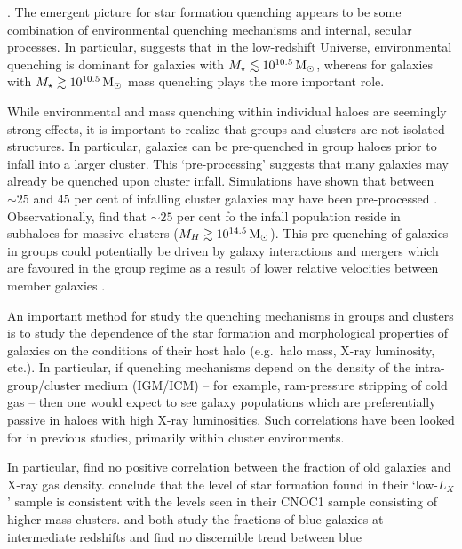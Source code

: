 \citep{balogh2004, muzzin2012}.  The emergent picture for star
formation quenching appears to be some combination of environmental
quenching mechanisms and internal, secular processes.  In particular,
\citep{peng2010} suggests that in the low-redshift Universe,
environmental quenching is dominant for galaxies with $M_\star \lesssim
10^{10.5}\,\mathrm{M_{\odot}}$, whereas for galaxies with $M_\star \gtrsim
10^{10.5}\,\mathrm{M_{\odot}}$ mass quenching plays the more important role.
\par
While environmental and mass quenching within individual haloes are
seemingly strong effects, it is important to realize that groups and
clusters are not isolated structures.  In particular, galaxies can be
pre-quenched in group haloes prior to infall into a larger cluster.
This `pre-processing' suggests that many galaxies may already be
quenched upon cluster infall.  Simulations have shown that between
$\sim 25$ and $45$ per cent of infalling cluster galaxies may have
been pre-processed \citep{mcgee2009, delucia2012}.  Observationally,
\citep{hou2014} find that $\sim 25$ per cent fo the infall population
reside in subhaloes for massive clusters ($M_H \gtrsim 10^{14.5}\,\mathrm{M_{\odot}}$).
This pre-quenching of galaxies in groups could potentially be driven
by galaxy interactions and mergers which are favoured in the group
regime as a result of lower relative velocities between member
galaxies \citep{barnes1985, brough2006}.
\par
An important method for study the quenching mechanisms in groups and
clusters is to study the dependence of the star formation and
morphological properties of galaxies on the conditions of their host
halo (e.g.\ halo mass, X-ray luminosity, etc.).  In particular, if
quenching mechanisms depend on the density of the intra-group/cluster
medium (IGM/ICM) -- for example, ram-pressure stripping of cold gas --
then one would expect to see galaxy populations which are
preferentially passive in haloes with high X-ray luminosities.  Such
correlations have been looked for in previous studies, primarily
within cluster environments.
\par
In particular, \citet{ellingson2001} find no positive correlation
between the fraction of old galaxies and X-ray gas density.
\citet{balogh2002a} conclude that the level of star formation found in
their `low-$L_X$' sample is consistent with the levels seen in their
CNOC1 sample consisting of higher mass clusters.  \citet{fairley2002}
and \citet{wake2005} both study the fractions of blue galaxies at
intermediate redshifts and find no discernible trend between blue
